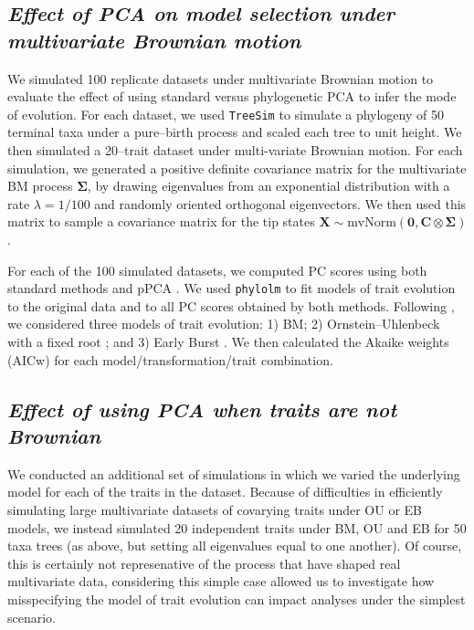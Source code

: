 \documentclass[a4paper,12pt]{article}
\begin{document}
\subsection{\emph{Effect of PCA on model selection under multivariate Brownian motion}}
We simulated 100 replicate datasets under multivariate Brownian motion to evaluate the effect of using standard versus phylogenetic PCA to infer the mode of evolution. For each dataset, we used \texttt{TreeSim} \citep{treesim} to simulate a phylogeny of 50 terminal taxa under a pure--birth process and scaled each tree to unit height. We then simulated a 20--trait dataset under multi-variate Brownian motion. For each simulation, we generated a positive definite covariance matrix for the multivariate BM process $\mathbf{\Sigma}$, by drawing eigenvalues from an exponential distribution with a rate $\lambda = \text{1/100}$ and randomly oriented orthogonal eigenvectors. We then used this matrix to sample a covariance matrix for the tip states $\mathbf{X}\sim \text{mvNorm}(\mathbf{0}, \mathbf{C} \otimes \mathbf{\Sigma})$.

For each of the 100 simulated datasets, we computed PC scores using both standard methods and pPCA \citep[using the \texttt{phytools} package][]{phytools}. We used \texttt{phylolm} \citep{HoandAne2014} to fit models of trait evolution to the original data and to all PC scores obtained by both methods. Following \citet{Harmon2010}, we considered three models of trait evolution: 1) BM; 2) Ornstein--Uhlenbeck with a fixed root \citep[OU;][]{ Hansen1997}; and 3) Early Burst \citep[EB;][]{Blomberg2003, Harmon2010}. We then calculated the Akaike weights (AICw) for each model/transformation/trait combination.


\subsection{\emph{Effect of using PCA when traits are not Brownian}}
We conducted an additional set of simulations in which we varied the underlying model for each of the traits in the dataset. Because of difficulties in efficiently simulating large multivariate datasets of covarying traits under OU or EB models, we instead simulated 20 independent traits under BM, OU and EB for 50 taxa trees (as above, but setting all eigenvalues equal to one another). Of course, this is certainly not represenative of the process that have shaped real multivariate data, considering this simple case allowed us to investigate how misspecifying the model of trait evolution can impact analyses under the simplest scenario.
\end{document}
